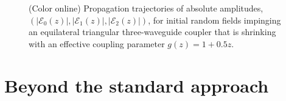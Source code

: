 \documentclass[9pt,twocolumn,twoside]{osajnl}
\begin{document}
\begin{figure}[htbp]
	\centering
	\caption{(Color online) Propagation trajectories of absolute amplitudes, $(\vert \mathcal{E}_{0}(z) \vert, \vert \mathcal{E}_{1}(z) \vert, \vert \mathcal{E}_{2}(z) \vert )$, for initial random fields impinging an equilateral triangular three-waveguide coupler that is shrinking with an effective coupling parameter $g(z) = 1 +0.5 z$.}
	\label{fig:Fig6}
\end{figure}


\section{Beyond the standard approach}
\end{document}
